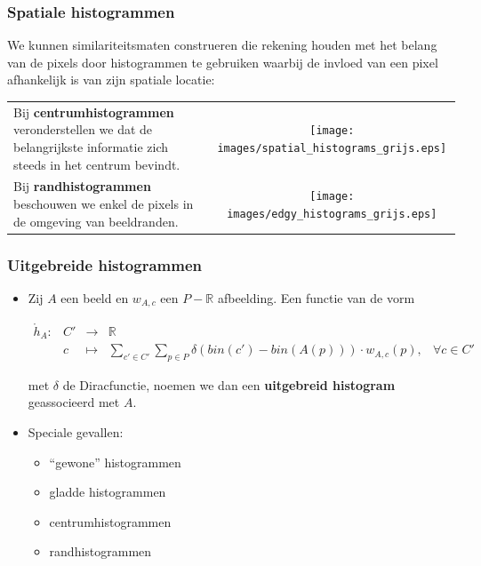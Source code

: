 \documentclass[dutch]{beamer}
\theoremstyle{definition}
\theoremstyle{remark}
\theoremstyle{example}
\begin{document}
\frame
{
  \frametitle{Spatiale histogrammen}
  
  We kunnen similariteitsmaten construeren
  die rekening houden met het belang van de pixels door histogrammen te gebruiken waarbij de
  invloed van een pixel afhankelijk is van zijn spatiale locatie:
  \begin{center}
  \begin{tabular}{@{}lc@{}}
  \begin{minipage}{0.55\textwidth}
  \raggedright
  Bij \textbf{centrumhistogrammen} veronderstellen we dat de belangrijkste informatie
  zich steeds in het centrum bevindt.
  \end{minipage} &
  \begin{minipage}{0.4\textwidth}
  \texttt{[image: images/spatial\_histograms\_grijs.eps]}
  \end{minipage}\vspace{8pt}\\
  \begin{minipage}{0.55\textwidth}
  Bij \textbf{randhistogrammen} beschouwen we enkel de pixels in de omgeving
  van beeldranden.
  \end{minipage} &
  \begin{minipage}{0.4\textwidth}
  \texttt{[image: images/edgy\_histograms\_grijs.eps]}
  \end{minipage}
  \end{tabular}
  \end{center}
}
\frame
{ 
  \frametitle{Uitgebreide histogrammen}
  
  \begin{itemize}
  \item Zij $A$ een beeld en $w_{A,c}$ een $P - \mathbb{R}$ afbeelding. Een functie van de vorm
  \begin{minipage}{\textwidth}
  \vspace{5pt}
  \centering
  \footnotesize
  $\begin{array}{rrcll}
  \mathring{h}_A: 
   & C' & \to & \mathbb{R} \\
   & c  & \mapsto & \displaystyle\sum_{c' \in C'} \sum_{p \in P} \delta (bin(c')-bin(A(p))) \cdot w_{A,c}(p), & 
   \forall c \in C'
  \end{array}$
  \vspace{5pt}
  \end{minipage}
  met $\delta$ de Diracfunctie, noemen we dan een \textbf{uitgebreid histogram} 
  geassocieerd met $A$.

  \item Speciale gevallen:
  \begin{itemize}
    \item ``gewone'' histogrammen
    \item gladde histogrammen
    \item centrumhistogrammen
    \item randhistogrammen
  \end{itemize}
  \end{itemize}
}
\end{document}
